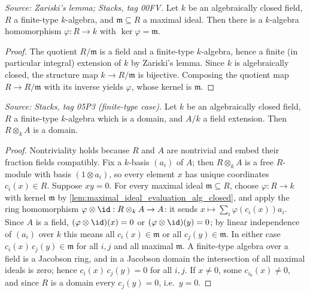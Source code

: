 \begin{lemma}

  \label{lem:maximal_ideal_evaluation_alg_closed}
  \textit{Source: Zariski's lemma; Stacks, tag 00FV.}
  Let \(k\) be an algebraically closed field, \(R\) a finite-type
  \(k\)-algebra, and \(\mathfrak m \subseteq R\) a maximal ideal. Then
  there is a \(k\)-algebra homomorphism \(\varphi : R \to k\) with
  \(\ker \varphi = \mathfrak m\).
\end{lemma}
\begin{proof}
  \leanok
  The quotient \(R/\mathfrak m\) is a field and a finite-type
  \(k\)-algebra, hence a finite (in particular integral) extension of
  \(k\) by Zariski's lemma. Since \(k\) is algebraically closed, the
  structure map \(k \to R/\mathfrak m\) is bijective. Composing the
  quotient map \(R \to R/\mathfrak m\) with its inverse yields
  \(\varphi\), whose kernel is \(\mathfrak m\).
\end{proof}

\begin{lemma}

  \label{lem:tensor_domain_finite_type_alg_closed}
  \textit{Source: Stacks, tag 05P3 (finite-type case).}
  Let \(k\) be an algebraically closed field, \(R\) a finite-type
  \(k\)-algebra which is a domain, and \(A/k\) a field extension. Then
  \(R \otimes_k A\) is a domain.
\end{lemma}
\begin{proof}
  \leanok
  Nontriviality holds because \(R\) and \(A\) are nontrivial and embed
  their fraction fields compatibly. Fix a \(k\)-basis \((a_i)\) of
  \(A\); then \(R \otimes_k A\) is a free \(R\)-module with basis
  \((1 \otimes a_i)\), so every element \(x\) has unique coordinates
  \(c_i(x) \in R\). Suppose \(x y = 0\). For every maximal ideal
  \(\mathfrak m \subseteq R\), choose
  \(\varphi : R \to k\) with kernel \(\mathfrak m\) by
  \cref{lem:maximal_ideal_evaluation_alg_closed}, and apply the ring
  homomorphism \(\varphi \otimes \id : R \otimes_k A \to A\): it sends
  \(x \mapsto \sum_i \varphi(c_i(x)) a_i\). Since \(A\) is a field,
  \((\varphi \otimes \id)(x) = 0\) or \((\varphi \otimes \id)(y) = 0\);
  by linear independence of \((a_i)\) over \(k\) this means all
  \(c_i(x) \in \mathfrak m\) or all \(c_j(y) \in \mathfrak m\). In
  either case \(c_i(x)\, c_j(y) \in \mathfrak m\) for all \(i, j\) and
  all maximal \(\mathfrak m\). A finite-type algebra over a field is a
  Jacobson ring, and in a Jacobson domain the intersection of all
  maximal ideals is zero; hence \(c_i(x)\, c_j(y) = 0\) for all
  \(i, j\). If \(x \neq 0\), some \(c_{i_0}(x) \neq 0\), and since
  \(R\) is a domain every \(c_j(y) = 0\), i.e.\ \(y = 0\).
\end{proof}

